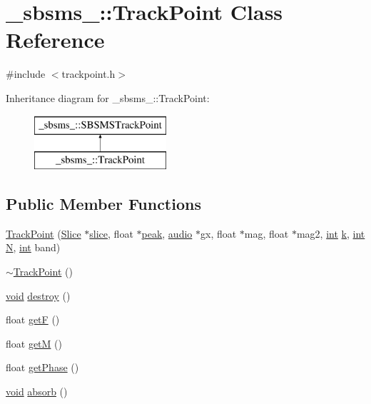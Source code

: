 \hypertarget{class__sbsms___1_1_track_point}{}\section{\+\_\+sbsms\+\_\+\+:\+:Track\+Point Class Reference}
\label{class__sbsms___1_1_track_point}


{\ttfamily \#include $<$trackpoint.\+h$>$}

Inheritance diagram for \+\_\+sbsms\+\_\+\+:\+:Track\+Point\+:\begin{figure}[H]
\begin{center}
\leavevmode
\includegraphics[height=2.000000cm]{class__sbsms___1_1_track_point}
\end{center}
\end{figure}
\subsection*{Public Member Functions}
\begin{DoxyCompactItemize}
\item 
\hyperlink{class__sbsms___1_1_track_point_ad2e99afe29aac81f32bcaf56a6d0c0ad}{Track\+Point} (\hyperlink{class__sbsms___1_1_slice}{Slice} $\ast$\hyperlink{class__sbsms___1_1_track_point_a0bbb574684a95045de6423e8821e3dda}{slice}, float $\ast$\hyperlink{class__sbsms___1_1_track_point_a1e81cff380f331d9169ce547dc02e0e9}{peak}, \hyperlink{namespace__sbsms___a11786cc5bd221ff534972ae350477324}{audio} $\ast$gx, float $\ast$mag, float $\ast$mag2, \hyperlink{xmltok_8h_a5a0d4a5641ce434f1d23533f2b2e6653}{int} \hyperlink{rfft2d_test_m_l_8m_adc468c70fb574ebd07287b38d0d0676d}{k}, \hyperlink{xmltok_8h_a5a0d4a5641ce434f1d23533f2b2e6653}{int} \hyperlink{rfft2d_test_m_l_8m_af6d1246b147a7c5763d9fc83082020ff}{N}, \hyperlink{xmltok_8h_a5a0d4a5641ce434f1d23533f2b2e6653}{int} band)
\item 
\hyperlink{class__sbsms___1_1_track_point_ace1ec4ba2c461544bc78065a1ef24d11}{$\sim$\+Track\+Point} ()
\item 
\hyperlink{sound_8c_ae35f5844602719cf66324f4de2a658b3}{void} \hyperlink{class__sbsms___1_1_track_point_afb7706d1a6c0e7df4fb520a9bf1cd83d}{destroy} ()
\item 
float \hyperlink{class__sbsms___1_1_track_point_ab77233d5ac5633ad3daf7d2bd9d49664}{getF} ()
\item 
float \hyperlink{class__sbsms___1_1_track_point_af9cf703946a3c010486c03d592621db3}{getM} ()
\item 
float \hyperlink{class__sbsms___1_1_track_point_a139505f1e2facd279186b5c5a09f989b}{get\+Phase} ()
\item 
\hyperlink{sound_8c_ae35f5844602719cf66324f4de2a658b3}{void} \hyperlink{class__sbsms___1_1_track_point_ab57863677e6a3cceabdf8657406be322}{absorb} ()
\end{DoxyCompactItemize}
